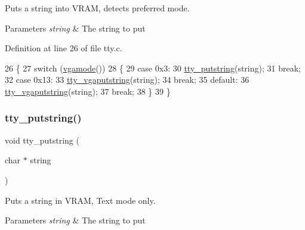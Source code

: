 Puts a string into V\+R\+AM, detects preferred mode. 


\begin{DoxyParams}{Parameters}
{\em string} & The string to put \\
\hline
\end{DoxyParams}


Definition at line 26 of file tty.\+c.


\begin{DoxyCode}
26                                   \{
27     \textcolor{keywordflow}{switch} (\hyperlink{a00008_af6d170c9401ea8f94d4c5cf09347cca7_af6d170c9401ea8f94d4c5cf09347cca7}{vgamode}())
28     \{
29     \textcolor{keywordflow}{case} 0x3:
30         \hyperlink{a00053_a2ebb962f457a2677d70285d1c0f9be12_a2ebb962f457a2677d70285d1c0f9be12}{tty\_putstring}(\textcolor{keywordtype}{string});
31         \textcolor{keywordflow}{break};
32     \textcolor{keywordflow}{case} 0x13:
33         \hyperlink{a00053_a13ff2c06d56753c5666ca56cb2d81100_a13ff2c06d56753c5666ca56cb2d81100}{tty\_vgaputstring}(\textcolor{keywordtype}{string});
34         \textcolor{keywordflow}{break};
35     \textcolor{keywordflow}{default}:
36         \hyperlink{a00053_a13ff2c06d56753c5666ca56cb2d81100_a13ff2c06d56753c5666ca56cb2d81100}{tty\_vgaputstring}(\textcolor{keywordtype}{string});
37         \textcolor{keywordflow}{break};
38     \}
39 \}
\end{DoxyCode}
\mbox{\label{a00056_a2ebb962f457a2677d70285d1c0f9be12_a2ebb962f457a2677d70285d1c0f9be12}} 
\subsubsection{\texorpdfstring{tty\+\_\+putstring()}{tty\_putstring()}}
{\footnotesize\ttfamily void tty\+\_\+putstring (\begin{DoxyParamCaption}\item[{char $\ast$}]{string }\end{DoxyParamCaption})}



Puts a string in V\+R\+AM, Text mode only. 


\begin{DoxyParams}{Parameters}
{\em string} & The string to put \\
\hline
\end{DoxyParams}



